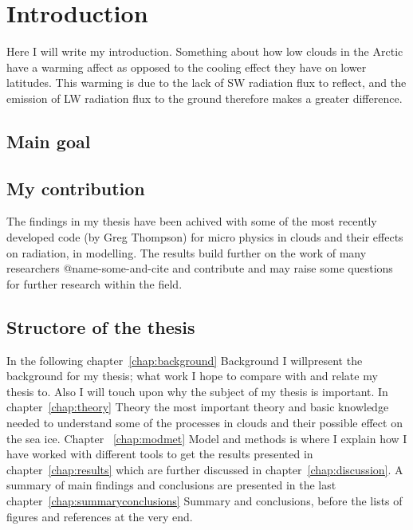 \chapter{Introduction}
\label{chap:introduction}
Here I will write my introduction.
Something about how low clouds in the Arctic have a warming affect as opposed to the cooling effect they have on lower latitudes. This warming is due to the lack of SW radiation flux to reflect, and the emission of LW radiation flux to the ground therefore makes a greater difference.

\section{Main goal}
\section{My contribution}
The findings in my thesis have been achived with some of the most recently developed code (by Greg Thompson) for micro physics in clouds and their effects on radiation, in modelling. The results build further on the work of many researchers @name-some-and-cite and contribute and may raise some questions for further research within the field.

\section{Structore of the thesis}
In the following chapter~\ref{chap:background} Background I willpresent the background for my thesis; what work I hope to compare with and relate my thesis to. Also I will touch upon why the subject of my thesis is important. In chapter~\ref{chap:theory} Theory the most important theory and basic knowledge needed to understand some of the processes in clouds and their possible effect on the sea ice.  Chapter ~\ref{chap:modmet} Model and methods is where I explain how I have worked with different tools to get the results presented in chapter~\ref{chap:results} which are further discussed in chapter~\ref{chap:discussion}. A summary of main findings and conclusions are presented in the last chapter~\ref{chap:summaryconclusions} Summary and conclusions, before the lists of figures and references at the very end.